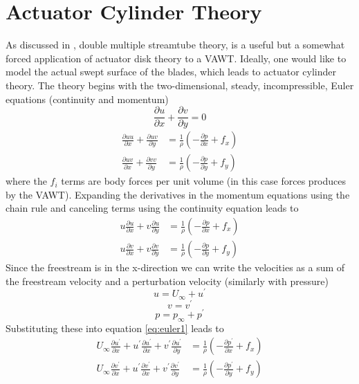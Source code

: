 \documentclass{article}
\begin{document}
\section{Actuator Cylinder Theory}
As discussed in , double multiple streamtube theory, is a useful but a somewhat forced application of actuator disk theory to a VAWT.  Ideally, one would like to model the actual swept surface of the blades, which leads to actuator cylinder theory.  The theory begins with the two-dimensional, steady, incompressible, Euler equations (continuity and momentum)
\begin{equation}
\frac{\partial u}{\partial x} + \frac{\partial v}{\partial y} = 0
\label{eq:continuity}
\end{equation}
\begin{equation}
\begin{aligned}
\frac{\partial u u}{\partial x} + \frac{\partial u v}{\partial y} &= \frac{1}{\rho}\left( -\frac{\partial p}{\partial x} + f_x\right)\\
\frac{\partial u v}{\partial x} + \frac{\partial v v}{\partial y} &= \frac{1}{\rho}\left(-\frac{\partial p}{\partial y} + f_y\right)
\label{eq:euler}
\end{aligned}
\end{equation}
where the $f_i$ terms are body forces per unit volume (in this case forces produces by the VAWT).  Expanding the derivatives in the momentum equations using the chain rule and canceling terms using the continuity equation leads to
\begin{equation}
\begin{aligned}
u \frac{\partial u}{\partial x} + v \frac{\partial u}{\partial y} &= \frac{1}{\rho}\left( -\frac{\partial p}{\partial x} + f_x\right) \\
u \frac{\partial v}{\partial x} + v \frac{\partial v}{\partial y} &= \frac{1}{\rho}\left( -\frac{\partial p}{\partial y} + f_y\right)
\label{eq:euler1}
\end{aligned}
\end{equation}
Since the freestream is in the x-direction we can write the velocities as a sum of the freestream velocity and a perturbation velocity (similarly with pressure)
\[ u = U_\infty + u^\prime \]
\[ v = v^\prime \]
\[ p = p_\infty + p^\prime \]
Substituting these into equation \eqref{eq:euler1} leads to
\begin{equation}
\begin{aligned}
U_\infty \frac{\partial u^\prime}{\partial x} + u^\prime \frac{\partial u^\prime}{\partial x} + v^\prime \frac{\partial u^\prime}{\partial y} &= \frac{1}{\rho}\left( -\frac{\partial p^\prime}{\partial x} + f_x\right) \\
U_\infty \frac{\partial v^\prime}{\partial x} + u^\prime \frac{\partial v^\prime}{\partial x} + v^\prime \frac{\partial v^\prime}{\partial y} &= \frac{1}{\rho}\left( -\frac{\partial p^\prime}{\partial y} + f_y\right)
\end{aligned}
\end{equation}
\end{document}
